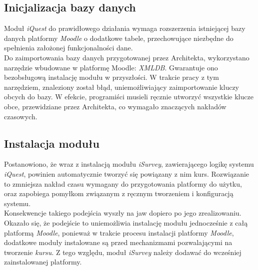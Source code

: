 \subsection{Inicjalizacja bazy danych}
\label{Chapter623}

Moduł \textit{iQuest} do prawidłowego działania wymaga rozszerzenia istniejącej bazy danych platformy \textit{Moodle} o dodatkowe tabele, przechowujące niezbędne do spełnienia założonej funkcjonalności dane. \\

Do zaimportowania bazy danych przygotowanej przez Architekta, wykorzystano narzędzie wbudowane w platformę Moodle: \textit{XMLDB}. Gwarantuje ono bezobsługową instalację modułu w przyszłości. W trakcie pracy z tym narzędziem, znaleziony został błąd, uniemożliwiający zaimportowanie kluczy obcych do bazy. W efekcie, programiści musieli ręcznie utworzyć wszystkie klucze obce, przewidziane przez Architekta, co wymagało znaczących nakładów czasowych.

\subsection{Instalacja modułu}
\label{Chapter624}
Postanowiono, że wraz z instalacją modułu \textit{iSurvey}, zawierającego logikę systemu \textit{iQuest}, powinien automatycznie tworzyć się powiązany z nim kurs. Rozwiązanie to zmniejsza nakład czasu wymagany do przygotowania platformy do użytku, oraz zapobiega pomyłkom związanym z ręcznym tworzeniem i konfiguracją systemu. \\

Konsekwencje takiego podejścia wyszły na jaw dopiero po jego zrealizowaniu. Okazało się, że podejście to uniemożliwia instalację modułu jednocześnie z całą platformą \textit{Moodle}, ponieważ w trakcie procesu instalacji platformy \textit{Moodle}, dodatkowe moduły instalowane są przed mechanizmami pozwalającymi na tworzenie \textit{kursu}. Z tego względu, moduł \textit{iSurvey} należy dodawać do wcześniej zainstalowanej platformy.